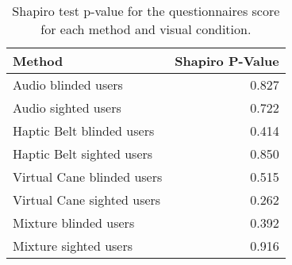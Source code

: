 
\begin{table}[!htb]
\centering
\caption{Shapiro test p-value for the questionnaires score for each method and visual condition.}
\label{tab:shapiro_questionnaires}
\begin{tabular}{lr}
\toprule
                    Method &  Shapiro P-Value \\
\midrule
       Audio blinded users &            0.827 \\
       Audio sighted users &            0.722 \\
 Haptic Belt blinded users &            0.414 \\
 Haptic Belt sighted users &            0.850 \\
Virtual Cane blinded users &            0.515 \\
Virtual Cane sighted users &            0.262 \\
     Mixture blinded users &            0.392 \\
     Mixture sighted users &            0.916 \\
\bottomrule
\end{tabular}
\end{table}

